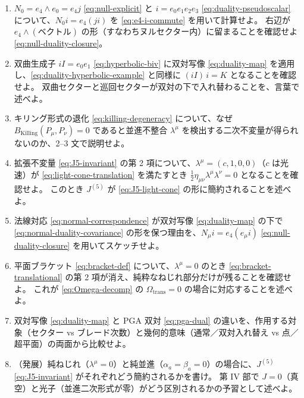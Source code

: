\documentclass[dvipdfmx,a4paper,oneside]{jsbook}
\numberwithin{equation}{chapter}
\begin{document}
\begin{enumerate}[leftmargin=2em]
  \item \(N_0 = e_4 \wedge e_0 = e_4 j\) \eqref{eq:null-explicit} と \(i = e_0 e_1 e_2 e_3\) \eqref{eq:duality-pseudoscalar} について、\(N_0 i = e_4 (j i)\) を \eqref{eq:e4-i-commute} を用いて計算せよ。
  右辺が \(e_4 \wedge (\text{ベクトル})\) の形（すなわちヌルセクター内）に留まることを確認せよ \eqref{eq:null-duality-closure}。

  \item 双曲生成子 \(iI = e_0 e_1\) \eqref{eq:hyperbolic-biv} に双対写像 \eqref{eq:duality-map} を適用し、\eqref{eq:duality-hyperbolic-example} と同様に \((iI)\, i = K\) となることを確認せよ。
  双曲セクターと巡回セクターが双対の下で入れ替わることを、言葉で述べよ。

  \item キリング形式の退化 \eqref{eq:killing-degeneracy} について、なぜ \(B_{\mathrm{Killing}}(P_\mu, P_\nu) = 0\) であると並進不整合 \(\lambda^\mu\) を検出する二次不変量が得られないのか、2--3 文で説明せよ。

  \item 拡張不変量 \eqref{eq:J5-invariant} の第 2 項について、\(\lambda^\mu = (c, 1, 0, 0)\)（\(c\) は光速）が \eqref{eq:light-cone-translation} を満たすとき \(\tfrac{1}{2}\eta_{\mu\nu}\lambda^\mu\lambda^\nu = 0\) となることを確認せよ。
  このとき \(J^{(5)}\) が \eqref{eq:J5-light-cone} の形に簡約されることを述べよ。

  \item 法線対応 \eqref{eq:normal-correspondence} が双対写像 \eqref{eq:duality-map} の下で \eqref{eq:normal-duality-covariance} の形を保つ理由を、\(N_\mu i = e_4(e_\mu i)\) \eqref{eq:null-duality-closure} を用いてスケッチせよ。

  \item 平面ブラケット \eqref{eq:bracket-def} について、\(\lambda^\mu = 0\) のとき \eqref{eq:bracket-translational} の第 2 項が消え、純粋なねじれ部分だけが残ることを確認せよ。
  これが \eqref{eq:Omega-decomp} の \(\Omega_{\mathrm{trans}} = 0\) の場合に対応することを述べよ。

  \item 双対写像 \eqref{eq:duality-map} と PGA 双対 \eqref{eq:pga-dual} の違いを、作用する対象（セクター vs ブレード次数）と幾何的意味（通常／双対入れ替え vs 点／超平面）の両面から比較せよ。

  \item （発展）純ねじれ（\(\lambda^\mu = 0\)）と純並進（\(\alpha_a = \beta_a = 0\)）の場合に、\(J^{(5)}\) \eqref{eq:J5-invariant} がそれぞれどう簡約されるかを書け。
  第 IV 部で \(J = 0\)（真空）と光子（並進二次形式が零）がどう区別されるかの予習として述べよ。
\end{enumerate}
\end{document}
